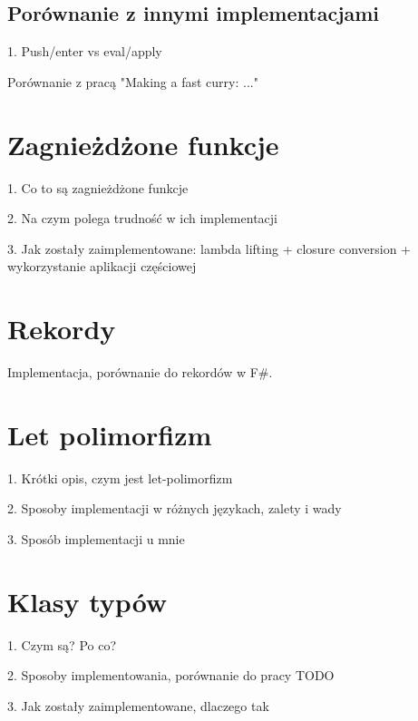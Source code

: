 \documentclass[declaration,shortabstract]{iithesis}
\begin{document}
\subsection{Porównanie z innymi implementacjami}

1. Push/enter vs eval/apply

Porównanie z pracą "Making a fast curry: ..."

\section{Zagnieżdżone funkcje}

1. Co to są zagnieżdżone funkcje 

2. Na czym polega trudność w ich implementacji 

3. Jak zostały zaimplementowane: lambda lifting + closure conversion + 
wykorzystanie aplikacji częściowej

\section{Rekordy}

Implementacja, porównanie do rekordów w F\#.

\section{Let polimorfizm}

1. Krótki opis, czym jest let-polimorfizm

2. Sposoby implementacji w różnych językach, zalety i wady 

3. Sposób implementacji u mnie

\section{Klasy typów}

1. Czym są? Po co? 

2. Sposoby implementowania, porównanie do pracy TODO

3. Jak zostały zaimplementowane, dlaczego tak


\end{document}
